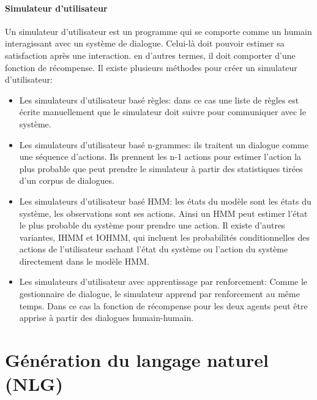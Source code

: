 \paragraph{Simulateur d'utilisateur}
Un simulateur d’utilisateur est un programme qui se comporte comme un humain interagissant avec un système de dialogue. Celui-là doit pouvoir estimer sa satisfaction après une interaction. en d’autres termes, il doit comporter d'une fonction de récompense. Il existe plusieurs méthodes pour créer un simulateur d’utilisateur:
\begin{itemize}
	\item Les simulateurs d’utilisateur basé règles: dans ce cas une liste de règles est écrite manuellement que le simulateur doit suivre pour communiquer avec le système\cite{Schatzmann2007}.
	\item Les simulateurs d’utilisateur basé n-grammes: ils traitent un dialogue comme une séquence d’actions. Ils prennent les n-1 actions pour estimer l’action la plus probable que peut prendre le simulateur à partir des statistiques tirées d'un	 corpus de dialogues\cite{Georgila2005}.
	\item Les simulateurs d’utilisateur basé HMM: les états du modèle sont les états du système, les observations sont ses actions. Ainsi un HMM peut estimer l’état le plus probable du système pour prendre une action. Il existe d’autres variantes, IHMM et IOHMM, qui incluent les probabilités conditionnelles des actions de l'utilisateur sachant l’état du système ou l’action du système directement dans le modèle HMM\cite{Cuayhuitl2005}.
	\item Les simulateurs d’utilisateur avec apprentissage par renforcement: Comme le gestionnaire de dialogue, le simulateur apprend par renforcement au même temps. Dans ce cas la fonction de récompense pour les deux agents peut être apprise à partir des dialogues humain-humain\cite{Chandramohan2011}.
\end{itemize}







\section{Génération du langage naturel (NLG)}\label{NLG}
